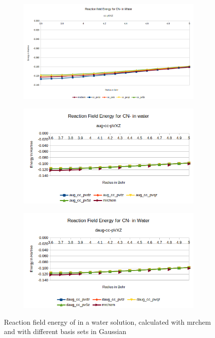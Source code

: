 \documentclass[../master_thesis.tex]{subfiles}
\begin{document}
\begin{figure}[h!]
  \centering
  \begin{subfigure}[b]{0.75\linewidth}
    \includegraphics[width=\linewidth]{img/Ercyan.png}
  \end{subfigure}
  \begin{subfigure}[b]{0.75\linewidth}
    \includegraphics[width=\linewidth]{img/Eraugcyan.png}
  \end{subfigure}
  \begin{subfigure}[b]{0.75\linewidth}
    \includegraphics[width=\linewidth]{img/Erdaugcyan.png}
  \end{subfigure}
  \caption{Reaction field energy of  in a water solution, calculated with mrchem
  and with different basis sets in Gaussian}
  \label{fig:cyanEnergyplots}
\end{figure}
\end{document}
